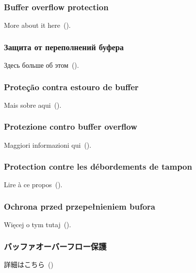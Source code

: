\ifdefined\ENGLISH
\subsubsection{Buffer overflow protection}

More about it here~().
\fi

\ifdefined\RUSSIAN
\subsubsection{Защита от переполнений буфера}

Здесь больше об этом~().
\fi

\ifdefined\BRAZILIAN
\subsubsection{Proteção contra estouro de buffer}

Mais sobre aqui~().
\fi

\ifdefined\ITALIAN
\subsubsection{Protezione contro buffer overflow}

Maggiori informazioni qui~().
\fi

\ifdefined\FRENCH
\subsubsection{Protection contre les débordements de tampon}

Lire à ce propos~().
\fi


\ifdefined\POLISH
\subsubsection{Ochrona przed przepełnieniem bufora}

Więcej o tym tutaj~().
\fi

\ifdefined\JAPANESE
\subsubsection{バッファオーバーフロー保護}

詳細はこちら~()
\fi
